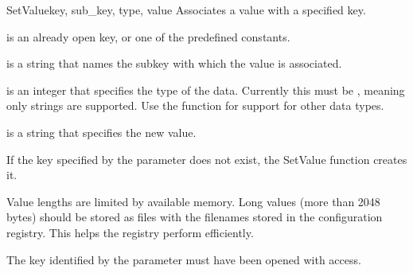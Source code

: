 \begin{funcdesc}{SetValue}{key, sub_key, type, value}
 Associates a value with a specified key.
 
  is an already open key, or one of the predefined 
  constants.

  is a string that names the subkey with which the value 
 is associated.
 
  is an integer that specifies the type of the data.
 Currently this must be , meaning only strings are
 supported.  Use the  function for support for
 other data types.
 
  is a string that specifies the new value.

 If the key specified by the  parameter does not exist,
 the SetValue function creates it.

 Value lengths are limited by available memory. Long values (more than
 2048 bytes) should be stored as files with the filenames stored in
 the configuration registry.  This helps the registry perform
 efficiently.

 The key identified by the  parameter must have been 
 opened with  access.
\end{funcdesc}


